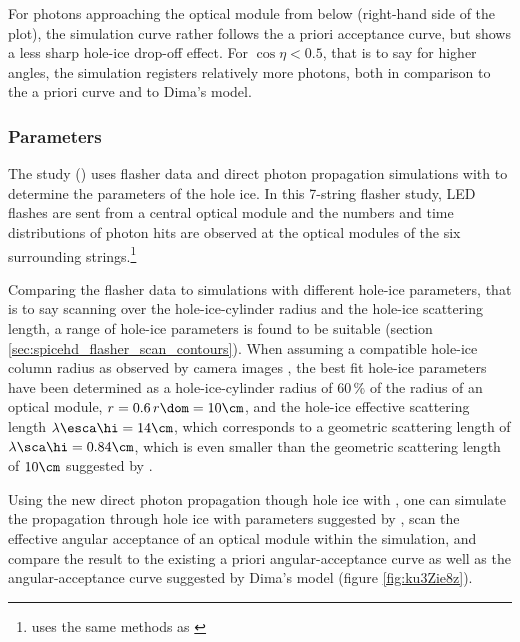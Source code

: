For photons approaching the optical module from below (right-hand side of the plot), the simulation curve rather follows the a priori acceptance curve, but shows a less sharp hole-ice drop-off effect. For $\cos\eta < 0.5$, that is to say for higher angles, the simulation registers relatively more photons, both in comparison to the a priori curve and to Dima's model.


\subsubsection{ Parameters}
\label{sec:spicehd_parameters}

The  study () uses flasher data and direct photon propagation simulations with \ppc to determine the parameters of the hole ice. In this 7-string flasher study, LED flashes are sent from a central optical module and the numbers and time distributions of photon hits are observed at the optical modules of the six surrounding strings.\footnote{ uses the same methods as \cite{icepaper,dimaslikelihood}}

Comparing the flasher data to simulations with different hole-ice parameters, that is to say scanning over the hole-ice-cylinder radius and the hole-ice scattering length, a range of hole-ice parameters is found to be suitable (section \ref{sec:spicehd_flasher_scan_contours}). When assuming a compatible hole-ice column radius as observed by camera images \cite{rongenswedishcamera}, the best fit hole-ice parameters have been determined as a hole-ice-cylinder radius of $60\,\%$ of the radius of an optical module, $r = 0.6\,r\dom = 10\cm$, and the hole-ice effective scattering length $\lambda\esca\hi = 14\cm$, which corresponds to a geometric scattering length of $\lambda\sca\hi = 0.84\cm$, which is even smaller than the geometric scattering length of $10\cm$ suggested by . \cite{martinspicehddard}

Using the new direct photon propagation though hole ice with \clsim, one can simulate the propagation through hole ice with parameters suggested by , scan the effective angular acceptance of an optical module within the simulation, and compare the result to the existing a priori angular-acceptance curve \cite{icepaper} as well as the angular-acceptance curve suggested by Dima's model \cite{flasherdataderivedicemodels} (figure \ref{fig:ku3Zie8z}).

